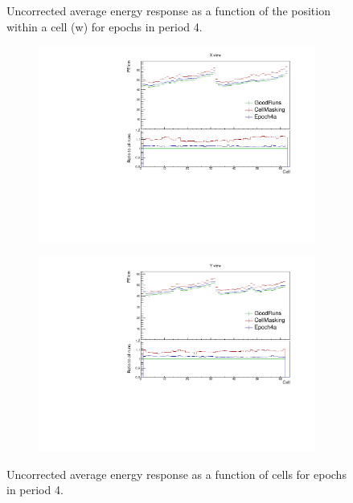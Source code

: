 \documentclass[12pt,a4paper]{article}
\begin{document}
\begin{figure}[!hbtp]
\begin{subfigure}[b]{0.495\textwidth}
\end{subfigure}
\caption{Uncorrected average energy response as a function of the position within a cell (w) for epochs in period 4.}
\label{figCalibhistWPE_period4}
\end{figure}

\begin{figure}[!hbtp]
\centering
\begin{subfigure}[b]{0.495\textwidth}
\centering
\includegraphics[width=\textwidth]{Plots/Attenprofs_P4Data_CellPE_X_Combined.pdf}
\end{subfigure}
\begin{subfigure}[b]{0.495\textwidth}
\centering
\includegraphics[width=\textwidth]{Plots/Attenprofs_P4Data_CellPE_Y_Combined.pdf}
\end{subfigure}
\caption{Uncorrected average energy response as a function of cells for epochs in period 4.}
\label{figCalibhistCellPE_period4}
\end{figure}
\end{document}
